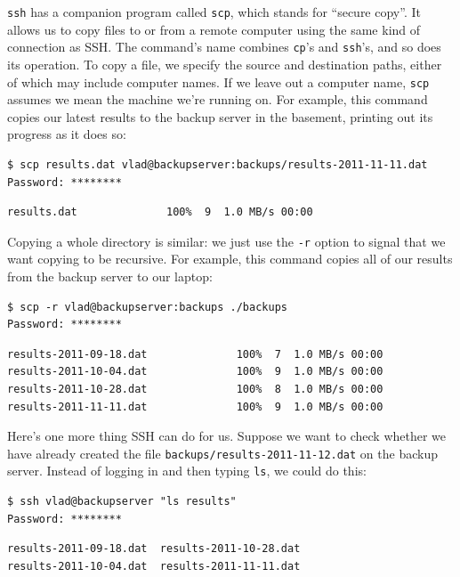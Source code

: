 \documentclass{book}
\begin{document}
\texttt{ssh} has a companion program called \texttt{scp}, which stands
for ``secure copy''. It allows us to copy files to or from a remote
computer using the same kind of connection as SSH. The command's name
combines \texttt{cp}'s and \texttt{ssh}'s, and so does its operation. To
copy a file, we specify the source and destination paths, either of
which may include computer names. If we leave out a computer name,
\texttt{scp} assumes we mean the machine we're running on. For example,
this command copies our latest results to the backup server in the
basement, printing out its progress as it does so:

\begin{verbatim}
$ scp results.dat vlad@backupserver:backups/results-2011-11-11.dat
Password: ********
\end{verbatim}

\begin{verbatim}
results.dat              100%  9  1.0 MB/s 00:00
\end{verbatim}

Copying a whole directory is similar: we just use the \texttt{-r} option
to signal that we want copying to be recursive. For example, this
command copies all of our results from the backup server to our laptop:

\begin{verbatim}
$ scp -r vlad@backupserver:backups ./backups
Password: ********
\end{verbatim}

\begin{verbatim}
results-2011-09-18.dat              100%  7  1.0 MB/s 00:00
results-2011-10-04.dat              100%  9  1.0 MB/s 00:00
results-2011-10-28.dat              100%  8  1.0 MB/s 00:00
results-2011-11-11.dat              100%  9  1.0 MB/s 00:00
\end{verbatim}

Here's one more thing SSH can do for us. Suppose we want to check
whether we have already created the file
\texttt{backups/results-2011-11-12.dat} on the backup server. Instead of
logging in and then typing \texttt{ls}, we could do this:

\begin{verbatim}
$ ssh vlad@backupserver "ls results"
Password: ********
\end{verbatim}

\begin{verbatim}
results-2011-09-18.dat  results-2011-10-28.dat
results-2011-10-04.dat  results-2011-11-11.dat
\end{verbatim}
\end{document}
